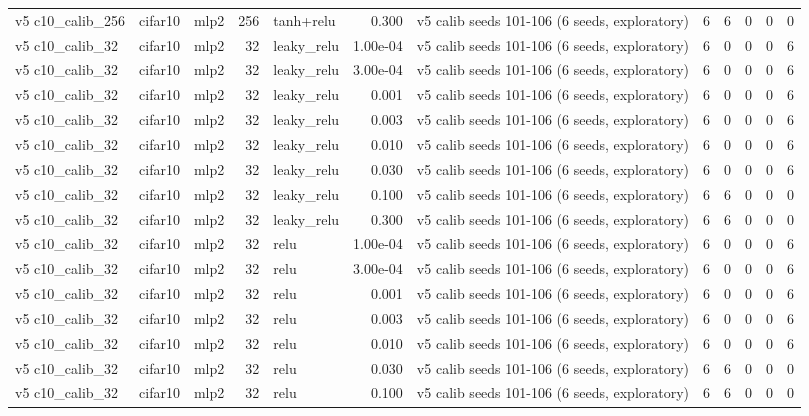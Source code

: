\begin{table}[htbp]
{\begin{tabular}{@{}lllrlrlrrrrr@{}}
v5 c10\_calib\_256 & cifar10 & mlp2 & 256 & tanh+relu & 0.300 & v5 calib seeds 101-106 (6 seeds, exploratory) & 6 & 6 & 0 & 0 & 0 \\
v5 c10\_calib\_32 & cifar10 & mlp2 & 32 & leaky\_relu & 1.00e-04 & v5 calib seeds 101-106 (6 seeds, exploratory) & 6 & 0 & 0 & 0 & 6 \\
v5 c10\_calib\_32 & cifar10 & mlp2 & 32 & leaky\_relu & 3.00e-04 & v5 calib seeds 101-106 (6 seeds, exploratory) & 6 & 0 & 0 & 0 & 6 \\
v5 c10\_calib\_32 & cifar10 & mlp2 & 32 & leaky\_relu & 0.001 & v5 calib seeds 101-106 (6 seeds, exploratory) & 6 & 0 & 0 & 0 & 6 \\
v5 c10\_calib\_32 & cifar10 & mlp2 & 32 & leaky\_relu & 0.003 & v5 calib seeds 101-106 (6 seeds, exploratory) & 6 & 0 & 0 & 0 & 6 \\
v5 c10\_calib\_32 & cifar10 & mlp2 & 32 & leaky\_relu & 0.010 & v5 calib seeds 101-106 (6 seeds, exploratory) & 6 & 0 & 0 & 0 & 6 \\
v5 c10\_calib\_32 & cifar10 & mlp2 & 32 & leaky\_relu & 0.030 & v5 calib seeds 101-106 (6 seeds, exploratory) & 6 & 0 & 0 & 0 & 6 \\
v5 c10\_calib\_32 & cifar10 & mlp2 & 32 & leaky\_relu & 0.100 & v5 calib seeds 101-106 (6 seeds, exploratory) & 6 & 6 & 0 & 0 & 0 \\
v5 c10\_calib\_32 & cifar10 & mlp2 & 32 & leaky\_relu & 0.300 & v5 calib seeds 101-106 (6 seeds, exploratory) & 6 & 6 & 0 & 0 & 0 \\
v5 c10\_calib\_32 & cifar10 & mlp2 & 32 & relu & 1.00e-04 & v5 calib seeds 101-106 (6 seeds, exploratory) & 6 & 0 & 0 & 0 & 6 \\
v5 c10\_calib\_32 & cifar10 & mlp2 & 32 & relu & 3.00e-04 & v5 calib seeds 101-106 (6 seeds, exploratory) & 6 & 0 & 0 & 0 & 6 \\
v5 c10\_calib\_32 & cifar10 & mlp2 & 32 & relu & 0.001 & v5 calib seeds 101-106 (6 seeds, exploratory) & 6 & 0 & 0 & 0 & 6 \\
v5 c10\_calib\_32 & cifar10 & mlp2 & 32 & relu & 0.003 & v5 calib seeds 101-106 (6 seeds, exploratory) & 6 & 0 & 0 & 0 & 6 \\
v5 c10\_calib\_32 & cifar10 & mlp2 & 32 & relu & 0.010 & v5 calib seeds 101-106 (6 seeds, exploratory) & 6 & 0 & 0 & 0 & 6 \\
v5 c10\_calib\_32 & cifar10 & mlp2 & 32 & relu & 0.030 & v5 calib seeds 101-106 (6 seeds, exploratory) & 6 & 6 & 0 & 0 & 0 \\
v5 c10\_calib\_32 & cifar10 & mlp2 & 32 & relu & 0.100 & v5 calib seeds 101-106 (6 seeds, exploratory) & 6 & 6 & 0 & 0 & 0 \\

\end{tabular}}
\end{table}

